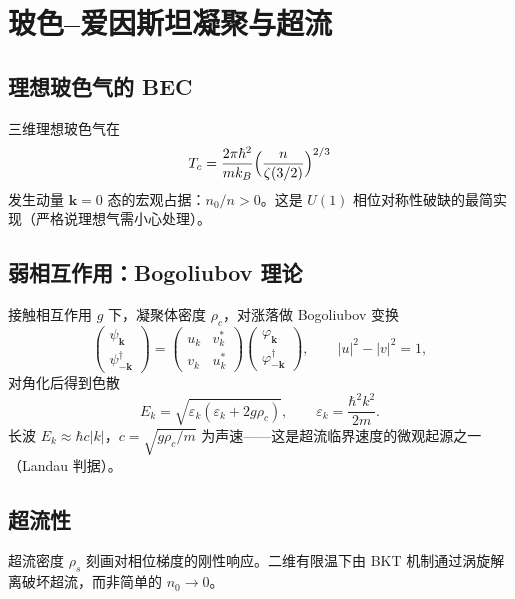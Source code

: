 \section{玻色--爱因斯坦凝聚与超流}

\subsection{理想玻色气的 BEC}

三维理想玻色气在
\begin{equation}
  T_c
  =\frac{2\pi\hbar^2}{mk_B}
  \Bigl(\frac{n}{\zeta(3/2)}\Bigr)^{2/3}
\end{equation}
发生动量 $\mathbf{k}=0$ 态的宏观占据：$n_0/n>0$。这是 $U(1)$ 相位对称性破缺的最简实现（严格说理想气需小心处理）。

\subsection{弱相互作用：Bogoliubov 理论}

接触相互作用 $g$ 下，凝聚体密度 $\rho_c$，对涨落做 Bogoliubov 变换
\begin{equation}
  \begin{pmatrix}\psi_{\mathbf{k}}\\\psi_{-\mathbf{k}}^\dagger\end{pmatrix}
  =
  \begin{pmatrix}u_k&v_k^*\\v_k&u_k^*\end{pmatrix}
  \begin{pmatrix}\varphi_{\mathbf{k}}\\\varphi_{-\mathbf{k}}^\dagger\end{pmatrix},
  \qquad
  |u|^2-|v|^2=1,
\end{equation}
对角化后得到色散
\begin{equation}
  E_k
  =\sqrt{
  \varepsilon_k(\varepsilon_k+2g\rho_c)
  },
  \qquad
  \varepsilon_k=\frac{\hbar^2k^2}{2m}.
\end{equation}
长波 $E_k\approx \hbar c |k|$，$c=\sqrt{g\rho_c/m}$ 为声速——这是超流临界速度的微观起源之一（Landau 判据）。

\subsection{超流性}

超流密度 $\rho_s$ 刻画对相位梯度的刚性响应。二维有限温下由 BKT 机制通过涡旋解离破坏超流，而非简单的 $n_0\to0$。
